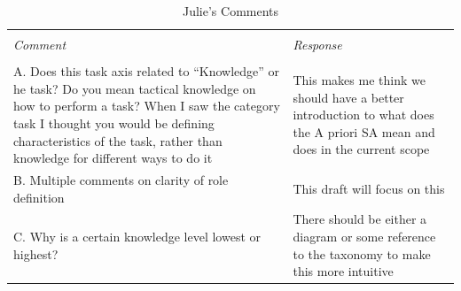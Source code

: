 \documentclass[letterpaper, 10 pt, conference]{ieeeconf} %
\theoremstyle{definition} \newtheorem{definition}{Definition}
\begin{document}
\begin{table}[b!]
  \caption{Julie's Comments}
  \begin{tabular}{p{8cm} p{8cm}}
    \toprule                                                                                               \\
    \textit{Comment}                                            & \textit{Response}                        \\
    \midrule                                                                                               \\
    A. Does this task axis related to ``Knowledge'' or he task? Do you mean tactical knowledge on how to
    perform a task? When I saw the category task I thought you would be defining characteristics of
    the task, rather than knowledge for different ways to do it & This makes me think we should
    have a better introduction to what does the A priori SA mean and does in the current scope             \\
    B. Multiple comments on clarity of role definition          & This draft will focus on this            \\
    C. Why is a certain knowledge level lowest or highest?      & There should be either a diagram or some
    reference to the taxonomy to make this more intuitive                                                  \\
    \bottomrule
  \end{tabular}
\end{table}
\end{document}
